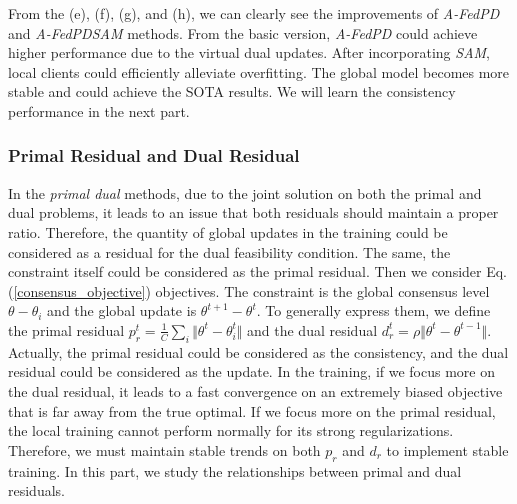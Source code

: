 From the (e), (f), (g), and (h), we can clearly see the improvements of \textit{A-FedPD} and \textit{A-FedPDSAM} methods. From the basic version, \textit{A-FedPD} could achieve higher performance due to the virtual dual updates. After incorporating \textit{SAM}, local clients could efficiently alleviate overfitting. The global model becomes more stable and could achieve the SOTA results. We will learn the consistency performance in the next part.

\newpage
\subsubsection{Primal Residual and Dual Residual}
In the \textit{primal dual} methods, due to the joint solution on both the primal and dual problems, it leads to an issue that both residuals should maintain a proper ratio. Therefore, the quantity of global updates in the training could be considered as a residual for the dual feasibility condition. The same, the constraint itself could be considered as the primal residual. Then we consider Eq.(\ref{consensus_objective}) objectives. The constraint is the global consensus level $\theta - \theta_i$ and the global update is $\theta^{t+1} - \theta^t$. To generally express them, we define the primal residual $p_r^t = \frac{1}{C}\sum_{i}\Vert \theta^t - \theta_i^t\Vert$ and the dual residual $d_r^t = \rho\Vert \theta^{t} - \theta^{t-1}\Vert$. Actually, the primal residual could be considered as the consistency, and the dual residual could be considered as the update. In the training, if we focus more on the dual residual, it leads to a fast convergence on an extremely biased objective that is far away from the true optimal. If we focus more on the primal residual, the local training cannot perform normally for its strong regularizations. Therefore, we must maintain stable trends on both $p_r$ and $d_r$ to implement stable training. In this part, we study the relationships between primal and dual residuals.
